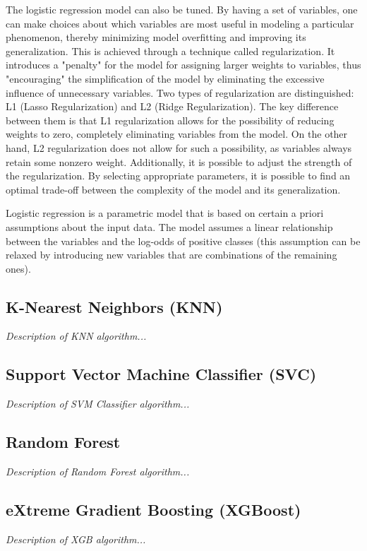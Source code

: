 The logistic regression model can also be tuned. By having a set of variables, one can make choices about which variables are most useful in modeling a particular phenomenon, thereby minimizing model overfitting and improving its generalization. This is achieved through a technique called regularization. It introduces a "penalty" for the model for assigning larger weights to variables, thus "encouraging" the simplification of the model by eliminating the excessive influence of unnecessary variables. Two types of regularization are distinguished: L1 (Lasso Regularization) and L2 (Ridge Regularization). The key difference between them is that L1 regularization allows for the possibility of reducing weights to zero, completely eliminating variables from the model. On the other hand, L2 regularization does not allow for such a possibility, as variables always retain some nonzero weight. Additionally, it is possible to adjust the strength of the regularization. By selecting appropriate parameters, it is possible to find an optimal trade-off between the complexity of the model and its generalization.

Logistic regression is a parametric model that is based on certain a priori assumptions about the input data. The model assumes a linear relationship between the variables and the log-odds of positive classes (this assumption can be relaxed by introducing new variables that are combinations of the remaining ones).

\subsection{K-Nearest Neighbors (KNN)}
\textit{Description of KNN algorithm...}

\subsection{Support Vector Machine Classifier (SVC)}
\textit{Description of SVM Classifier algorithm...}

\subsection{Random Forest}
\textit{Description of Random Forest algorithm...}

\subsection{eXtreme Gradient Boosting (XGBoost)}
\textit{Description of XGB algorithm...}

